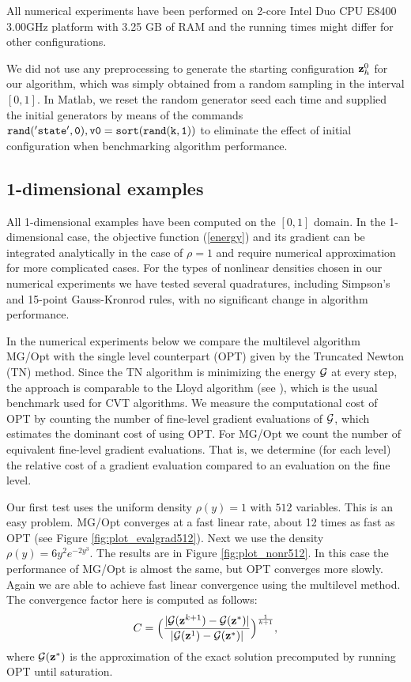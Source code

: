 \documentclass{siamltex}
\newcommand{\ds}{\displaystyle}
\begin{document}
All numerical experiments have been performed on 2-core Intel Duo CPU E8400 3.00GHz platform with 3.25 GB of RAM and the running times might differ for other configurations.

We did not use any preprocessing to generate the starting configuration ${\bf z}_h^0$ for our algorithm, which was simply obtained from a random sampling in the interval $[0,1]$. In Matlab, we reset the random generator seed each time and supplied the initial generators by means of the commands $\tt{rand('state',0), v0=sort(rand(k,1))}$ to eliminate the effect of initial configuration when benchmarking algorithm performance.

\subsection{1-dimensional examples}

All 1-dimensional examples have been computed on the $[0,1]$ domain. In the 1-dimensional case, the objective function (\ref{energy}) and its gradient can be integrated analytically in the case of $\rho=1$ and require numerical approximation for more complicated cases. For the types of nonlinear densities chosen in our numerical experiments we have tested several quadratures, including Simpson's and 15-point Gauss-Kronrod rules, with no significant change in algorithm performance.

In the numerical experiments below we compare the multilevel algorithm MG/Opt with the single level %
counterpart (OPT) given by the Truncated Newton (TN) method. Since the TN algorithm is minimizing the %
energy $\cg$ at every step, the approach is comparable %
to the Lloyd algorithm (see \cite{DEJ}), which is the usual benchmark used for CVT algorithms.  We measure the computational cost of OPT by counting the number of fine-level gradient evaluations of $\cg$, which estimates the dominant cost of using OPT.  For MG/Opt we count the number of equivalent fine-level gradient evaluations.  That is, we determine (for each level) the relative cost of a gradient evaluation compared to an evaluation on the fine level.

Our first test uses the uniform density $\rho(y) = 1$ with $512$ variables.  This is an easy problem.  MG/Opt converges at a fast linear rate, about 12 times as fast as OPT  (see Figure \ref{fig:plot_evalgrad512}). Next we use the density $\rho(y)=6y^{2}e^{-2y^{3}}$.  The results are in Figure \ref{fig:plot_nonr512}.  In this case the performance of MG/Opt is almost the same, but OPT converges more slowly.  Again we are able to achieve fast linear convergence using the multilevel method. The convergence factor here is computed as follows:
\begin{equation}
\ds C=\Big(\frac{|\cg(\bz^{k+1})-\cg(\bz^{*})| }{|\cg(\bz^{1})-\cg(\bz^{*})| }\Big)^\frac{1}{k+1},
\label{C2}
\end{equation}
where $\cg(\bz^{*})$ is the approximation of the exact solution precomputed by running OPT until saturation.
\end{document}
